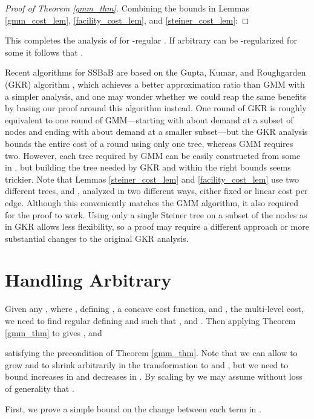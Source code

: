 \documentclass[11pt]{article}
\begin{document}
\begin{proof}[Proof of Theorem \ref{gmm_thm}]
Combining the bounds in Lemmas \ref{gmm_cost_lem}, \ref{facility_cost_lem}, and \ref{steiner_cost_lem}:

\end{proof}

This completes the analysis of  for -regular .  If arbitrary  can be -regularized for some  it follows that .

Recent algorithms for SSBaB are based on the 
Gupta, Kumar, and Roughgarden (GKR) algorithm \cite{gupta2003sab, gupta2007approximation}, which achieves a better approximation ratio than GMM with a simpler analysis, and one may wonder whether we could reap the same benefits by basing our proof around this algorithm instead.  One round of GKR is roughly equivalent to one round of GMM---starting with about  demand at a subset of nodes and ending with about  demand at a smaller subset---but the GKR analysis bounds the entire cost of a round using only one tree, whereas GMM requires two.  However, each tree required by GMM can be easily constructed from some  in , but building the tree needed by GKR and within the right bounds seems trickier.  Note that Lemmas \ref{steiner_cost_lem} and \ref{facility_cost_lem}
use two different trees,  and , analyzed in two different ways, either fixed or linear cost per edge.  Although this conveniently matches the GMM algorithm, it also required for the proof to work.  
Using only a single Steiner tree on a subset of the nodes as in GKR allows less flexibility,
so a proof may require a different approach or more substantial changes to the original GKR analysis.

\section {Handling Arbitrary }
\label{regularization_section}

Given any , where , defining , a concave cost function, and , the multi-level cost, we need to find regular  defining  and  such that  , and .  Then applying Theorem \ref{gmm_thm} to  gives , and 

satisfying the precondition of Theorem \ref{gmm_thm}.
Note that we can allow  to grow and  to shrink arbitrarily in the transformation to  and , but we need to bound increases in  and decreases in .  By scaling by  we may assume without loss of generality that .

First, we prove a simple bound on the change between each term  in .
\end{document}
